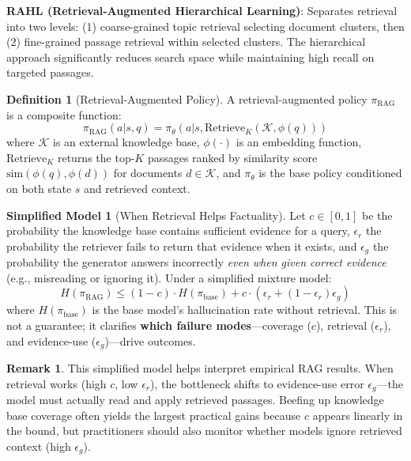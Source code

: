 \documentclass[12pt,a4paper]{report}
\theoremstyle{definition}
\newtheorem{definition}[theorem]{Definition}
\newtheorem{remark}[theorem]{Remark}
\newtheorem{toymodel}[theorem]{Simplified Model}
\begin{document}
\textbf{RAHL (Retrieval-Augmented Hierarchical Learning)}: Separates retrieval into two levels: (1) coarse-grained topic retrieval selecting document clusters, then (2) fine-grained passage retrieval within selected clusters. The hierarchical approach significantly reduces search space while maintaining high recall on targeted passages.

\begin{definition}[Retrieval-Augmented Policy]
\label{def:rap}
A retrieval-augmented policy $\pi_{\text{RAG}}$ is a composite function:
\begin{equation}
\pi_{\text{RAG}}(a | s, q) = \pi_\theta\left(a \Big| s, \text{Retrieve}_K\left(\mathcal{K}, \phi(q)\right)\right)
\end{equation}
where $\mathcal{K}$ is an external knowledge base, $\phi(\cdot)$ is an embedding function, $\text{Retrieve}_K$ returns the top-$K$ passages ranked by similarity score $\text{sim}(\phi(q), \phi(d))$ for documents $d \in \mathcal{K}$, and $\pi_\theta$ is the base policy conditioned on both state $s$ and retrieved context.
\end{definition}

\begin{toymodel}[When Retrieval Helps Factuality]
\label{prop:hallucination}
Let $c \in [0,1]$ be the probability the knowledge base contains sufficient evidence for a query, $\epsilon_r$ the probability the retriever fails to return that evidence when it exists, and $\epsilon_g$ the probability the generator answers incorrectly \emph{even when given correct evidence} (e.g., misreading or ignoring it). Under a simplified mixture model:
\begin{equation}
H(\pi_{\text{RAG}}) \leq (1 - c) \cdot H(\pi_{\text{base}}) + c \cdot \left(\epsilon_r + (1-\epsilon_r)\epsilon_g\right)
\end{equation}
where $H(\pi_{\text{base}})$ is the base model's hallucination rate without retrieval. This is not a guarantee; it clarifies \textbf{which failure modes}---coverage ($c$), retrieval ($\epsilon_r$), and evidence-use ($\epsilon_g$)---drive outcomes.
\end{toymodel}

\begin{remark}
This simplified model helps interpret empirical RAG results. When retrieval works (high $c$, low $\epsilon_r$), the bottleneck shifts to evidence-use error $\epsilon_g$---the model must actually read and apply retrieved passages. Beefing up knowledge base coverage often yields the largest practical gains because $c$ appears linearly in the bound, but practitioners should also monitor whether models ignore retrieved context (high $\epsilon_g$).
\end{remark}
\end{document}
